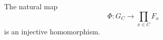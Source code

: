 \documentclass[preview]{standalone}
\begin{document}
The natural map \[\Phi : G_{C} \to \prod_{x \in C} F_{x}\] is an injective homomorphism.\\
\end{document}
